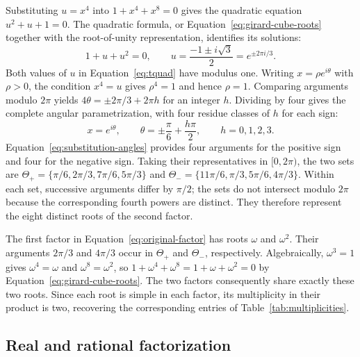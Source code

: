 \documentclass[11pt,a4paper]{article}
\numberwithin{equation}{section}
\theoremstyle{uprightpaper}
\begin{document}
Substituting $u=x^4$ into $1+x^4+x^8=0$ gives the quadratic equation $u^2+u+1=0$. The quadratic formula, or Equation~\eqref{eq:girard-cube-roots} together with the root-of-unity representation, identifies its solutions:
\begin{equation}\label{eq:tquad}
 1+u+u^2=0,\qquad u=\frac{-1\pm i\sqrt3}{2}=e^{\pm2\pi i/3}.
\end{equation}
Both values of $u$ in Equation~\eqref{eq:tquad} have modulus one. Writing $x=\rho e^{i\theta}$ with $\rho>0$, the condition $x^4=u$ gives $\rho^4=1$ and hence $\rho=1$. Comparing arguments modulo $2\pi$ yields $4\theta=\pm2\pi/3+2\pi h$ for an integer $h$. Dividing by four gives the complete angular parametrization, with four residue classes of $h$ for each sign:
\begin{equation}\label{eq:substitution-angles}
 x=e^{i\theta},\qquad
 \theta=\pm\frac{\pi}{6}+\frac{h\pi}{2},\qquad h=0,1,2,3.
\end{equation}
Equation~\eqref{eq:substitution-angles} provides four arguments for the positive sign and four for the negative sign. Taking their representatives in $[0,2\pi)$, the two sets are
$\Theta_{+}=\{\pi/6,2\pi/3,7\pi/6,5\pi/3\}$ and
$\Theta_{-}=\{11\pi/6,\pi/3,5\pi/6,4\pi/3\}$.
Within each set, successive arguments differ by $\pi/2$; the sets do not intersect modulo $2\pi$ because the corresponding fourth powers are distinct. They therefore represent the eight distinct roots of the second factor.

The first factor in Equation~\eqref{eq:original-factor} has roots $\omega$ and $\omega^2$. Their arguments $2\pi/3$ and $4\pi/3$ occur in $\Theta_+$ and $\Theta_-$, respectively. Algebraically, $\omega^3=1$ gives $\omega^4=\omega$ and $\omega^8=\omega^2$, so $1+\omega^4+\omega^8=1+\omega+\omega^2=0$ by Equation~\eqref{eq:girard-cube-roots}. The two factors consequently share exactly these two roots. Since each root is simple in each factor, its multiplicity in their product is two, recovering the corresponding entries of Table~\ref{tab:multiplicities}.

\subsection{Real and rational factorization}\label{subsec:real-rational}
\end{document}
